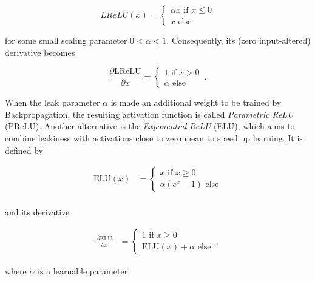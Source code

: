 \[  LReLU(x) = \begin{cases}
			\alpha x \text{ if } x \leq 0\\
			x \text{ else}
		 \end{cases}
\]

\noindent for some small scaling parameter $0 < \alpha < 1$. Consequently, its (zero input-altered) derivative becomes

\[ \frac{\partial \text{LReLU}}{\partial x} = \begin{cases}
							1 \text { if } x > 0\\
							\alpha \text{ else}
						        \end{cases} \,.
\]

\noindent When the leak parameter $\alpha$ is made an additional weight to be trained by Backpropagation, the resulting activation function is called \textit{Parametric ReLU} (PReLU). \cite{rectifiers} Another alternative is the \textit{Exponential ReLU} (ELU), \cite{elu} which aims to combine leakiness with activations close to zero mean to speed up learning. It is defined by

\begin {align}
	\text{ELU}(x) &= \begin{cases}
			x \text { if } x \geq 0\\
			\alpha(e^x - 1) \text{ else}
		     \end{cases}\\
\end {align}

and its derivative 

\begin {align}
	\frac{\partial \text{ELU}}{\partial x} &= \begin{cases}
								1 \text { if } x \geq 0\\
								\text{ELU}(x) + \alpha \text{ else}
		    				     \end{cases} \,,
\end {align}

\noindent where $\alpha$ is a learnable parameter.


